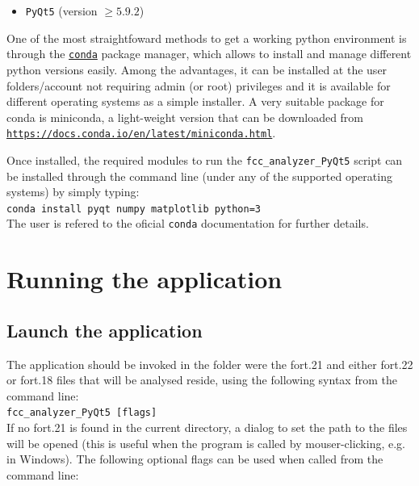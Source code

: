 \documentclass[a4paper,11pt]{article}
\begin{document}
\begin{itemize}
 \item \texttt{PyQt5} (version $\geq5.9.2$)
\end{itemize}


One of the most straightfoward methods to get a working python environment is through the \href{http://conda.pydata.org/docs/intro.html}{\texttt{conda}} package manager, which allows to install and manage different python versions easily. Among the advantages, it can be installed at the user folders/account not requiring admin (or root) privileges and it is available for different operating systems as a simple installer. A very suitable package for conda is miniconda, a light-weight version that can be downloaded from \href{https://docs.conda.io/en/latest/miniconda.html}{\texttt{https://docs.conda.io/en/latest/miniconda.html}}.

Once installed, the required modules to run the \texttt{fcc\_analyzer\_PyQt5} script can be installed through the command line (under any of the supported operating systems) by simply typing:\\

\texttt{conda install pyqt numpy matplotlib python=3}\\

The user is refered to the oficial \texttt{conda} documentation for further details.


\section{Running the application}

\subsection{Launch the application}
The application should be invoked in the folder were the fort.21 and either fort.22 or fort.18 files that will be analysed reside, using the following syntax from the command line:\\

\texttt{fcc\_analyzer\_PyQt5 [flags]}\\

If no fort.21 is found in the current directory, a dialog to set the path to the files will be opened (this is useful when the program is called by mouser-clicking, e.g. in Windows). The following optional flags can be used when called from the command line:
\end{document}
